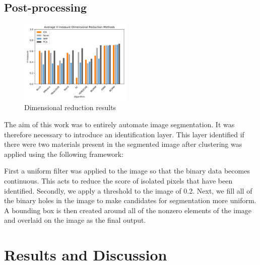 \documentclass[a4paper,11pt]{article}
\begin{document}
\subsection{Post-processing}

\begin{figure}
  
  \begin{center}
    \includegraphics[width=0.48\textwidth]{figures/red_methods.png}
  \end{center}
  
  \caption{Dimensional reduction results}
  
  \label{results:dr}
\end{figure}

The aim of this work was to entirely automate image segmentation. It was therefore necessary to introduce an identification layer. This layer identified if there were two materials present in the segmented image after clustering was applied using the following framework:

First a uniform filter was applied to the image so that the binary data becomes continuous. This acts to reduce the score of isolated pixels that have been identified. Secondly, we apply a threshold to the image of 0.2. Next, we fill all of the binary holes in the image to make candidates for segmentation more uniform. A bounding box is then created around all of the nonzero elements of the image and overlaid on the image as the final output.







\section{Results and Discussion}
\end{document}
